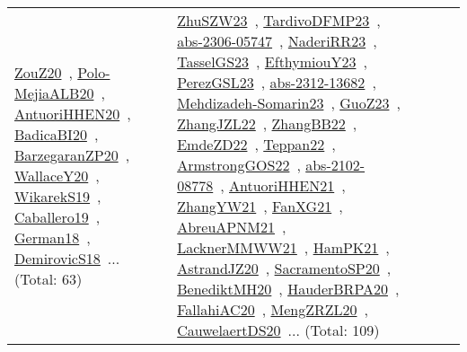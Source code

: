 {\begin{longtable}{lp{3cm}>{\raggedright\arraybackslash}p{6cm}>{\raggedright\arraybackslash}p{6cm}>{\raggedright\arraybackslash}p{8cm}}
\href{../works/ZouZ20.pdf}{ZouZ20}~\cite{ZouZ20}, \href{../works/Polo-MejiaALB20.pdf}{Polo-MejiaALB20}~\cite{Polo-MejiaALB20}, \href{../works/AntuoriHHEN20.pdf}{AntuoriHHEN20}~\cite{AntuoriHHEN20}, \href{../works/BadicaBI20.pdf}{BadicaBI20}~\cite{BadicaBI20}, \href{../works/BarzegaranZP20.pdf}{BarzegaranZP20}~\cite{BarzegaranZP20}, \href{../works/WallaceY20.pdf}{WallaceY20}~\cite{WallaceY20}, \href{../works/WikarekS19.pdf}{WikarekS19}~\cite{WikarekS19}, \href{../works/Caballero19.pdf}{Caballero19}~\cite{Caballero19}, \href{../works/German18.pdf}{German18}~\cite{German18}, \href{../works/DemirovicS18.pdf}{DemirovicS18}~\cite{DemirovicS18}... (Total: 63) & \href{../works/ZhuSZW23.pdf}{ZhuSZW23}~\cite{ZhuSZW23}, \href{../works/TardivoDFMP23.pdf}{TardivoDFMP23}~\cite{TardivoDFMP23}, \href{../works/abs-2306-05747.pdf}{abs-2306-05747}~\cite{abs-2306-05747}, \href{../works/NaderiRR23.pdf}{NaderiRR23}~\cite{NaderiRR23}, \href{../works/TasselGS23.pdf}{TasselGS23}~\cite{TasselGS23}, \href{../works/EfthymiouY23.pdf}{EfthymiouY23}~\cite{EfthymiouY23}, \href{../works/PerezGSL23.pdf}{PerezGSL23}~\cite{PerezGSL23}, \href{../works/abs-2312-13682.pdf}{abs-2312-13682}~\cite{abs-2312-13682}, \href{../works/Mehdizadeh-Somarin23.pdf}{Mehdizadeh-Somarin23}~\cite{Mehdizadeh-Somarin23}, \href{../works/GuoZ23.pdf}{GuoZ23}~\cite{GuoZ23}, \href{../works/ZhangJZL22.pdf}{ZhangJZL22}~\cite{ZhangJZL22}, \href{../works/ZhangBB22.pdf}{ZhangBB22}~\cite{ZhangBB22}, \href{../works/EmdeZD22.pdf}{EmdeZD22}~\cite{EmdeZD22}, \href{../works/Teppan22.pdf}{Teppan22}~\cite{Teppan22}, \href{../works/ArmstrongGOS22.pdf}{ArmstrongGOS22}~\cite{ArmstrongGOS22}, \href{../works/abs-2102-08778.pdf}{abs-2102-08778}~\cite{abs-2102-08778}, \href{../works/AntuoriHHEN21.pdf}{AntuoriHHEN21}~\cite{AntuoriHHEN21}, \href{../works/ZhangYW21.pdf}{ZhangYW21}~\cite{ZhangYW21}, \href{../works/FanXG21.pdf}{FanXG21}~\cite{FanXG21}, \href{../works/AbreuAPNM21.pdf}{AbreuAPNM21}~\cite{AbreuAPNM21}, \href{../works/LacknerMMWW21.pdf}{LacknerMMWW21}~\cite{LacknerMMWW21}, \href{../works/HamPK21.pdf}{HamPK21}~\cite{HamPK21}, \href{../works/AstrandJZ20.pdf}{AstrandJZ20}~\cite{AstrandJZ20}, \href{../works/SacramentoSP20.pdf}{SacramentoSP20}~\cite{SacramentoSP20}, \href{../works/BenediktMH20.pdf}{BenediktMH20}~\cite{BenediktMH20}, \href{../works/HauderBRPA20.pdf}{HauderBRPA20}~\cite{HauderBRPA20}, \href{../works/FallahiAC20.pdf}{FallahiAC20}~\cite{FallahiAC20}, \href{../works/MengZRZL20.pdf}{MengZRZL20}~\cite{MengZRZL20}, \href{../works/CauwelaertDS20.pdf}{CauwelaertDS20}~\cite{CauwelaertDS20}... (Total: 109)\\

\end{longtable}}
